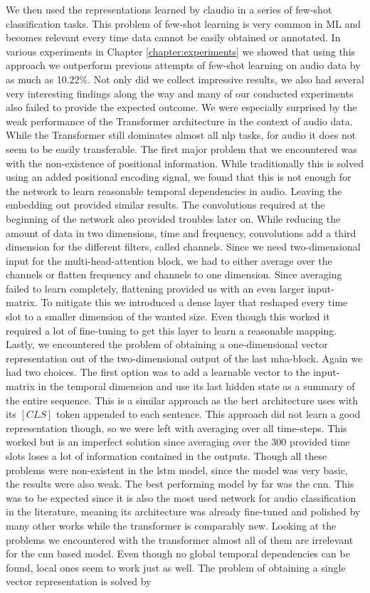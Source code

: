 We then used the representations learned by \gls{claudio} in a series of few-shot classification tasks. This problem of few-shot learning is very common in ML and becomes relevant every time data cannot be easily obtained or annotated. In various experiments in Chapter \ref{chapter:experiments} we showed that using this approach we outperform previous attempts of few-shot learning on audio data by as much as 10.22\%. Not only did we collect impressive results, we also had several very interesting findings along the way and many of our conducted experiments also failed to provide the expected outcome. We were especially surprised by the weak performance of the Transformer architecture in the context of audio data. While the Transformer still dominates almost all \gls{nlp} tasks, for audio it does not seem to be easily transferable. The first major problem that we encountered was with the non-existence of positional information. While traditionally this is solved using an added positional encoding signal, we found that this is not enough for the network to learn reasonable temporal dependencies in audio. Leaving the embedding out provided similar results. The convolutions required at the beginning of the network also provided troubles later on. While reducing the amount of data in two dimensions, time and frequency, convolutions add a third dimension for the different filters, called channels. Since we need two-dimensional input for the multi-head-attention block, we had to either average over the channels or flatten frequency and channels to one dimension. Since averaging failed to learn completely, flattening provided us with an even larger input-matrix. To mitigate this we introduced a dense layer that reshaped every time slot to a smaller dimension of the wanted size. Even though this worked it required a lot of fine-tuning to get this layer to learn a reasonable mapping. Lastly, we encountered the problem of obtaining a one-dimensional vector representation out of the two-dimensional output of the last \gls{mha}-block. Again we had two choices. The first option was to add a learnable vector to the input-matrix in the temporal dimension and use its last hidden state as a summary of the entire sequence. This is a similar approach as the \gls{bert} architecture \cite{devlin2019bert} uses with its $[CLS]$ token appended to each sentence. This approach did not learn a good representation though, so we were left with averaging over all time-steps. This worked but is an imperfect solution since averaging over the 300 provided time slots loses a lot of information contained in the outputs. Though all these problems were non-existent in the \gls{lstm} model, since the model was very basic, the results were also weak. The best performing model by far was the \gls{cnn}. This was to be expected since it is also the most used network for audio classification in the literature, meaning its architecture was already fine-tuned and polished by many other works while the transformer is comparably new. Looking at the problems we encountered with the transformer almost all of them are irrelevant for the \gls{cnn} based model. Even though no global temporal dependencies can be found, local ones seem to work just as well. The problem of obtaining a single vector representation is solved by 